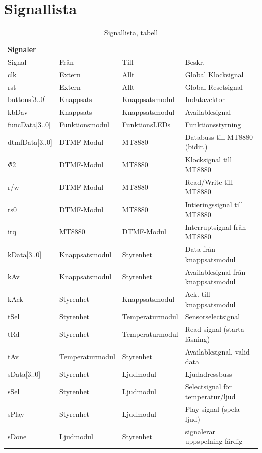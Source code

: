 \documentclass[a4paper,11pt]{article}
\begin{document}
	\section{Signallista}
	\begin{table} [H]
	\label{tab:signalTabell}
	\caption{Signallista, tabell} 
	\begin{tabular}{l l l l}
		{\bf Signaler}
		\\{Signal} & {Från} & {Till} & {Beskr.}\\
		\hline
		clk & Extern & Allt & Global Klocksignal\\
		rst & Extern & Allt & Global Resetsignal\\
		buttons[3..0] & Knappsats & Knappsatsmodul & Indatavektor\\
		kbDav & Knappsats & Knappsatsmodul & Availablesignal\\
		funcData[3..0] & Funktionsmodul & FunktionsLEDs & Funktionsstyrning\\
		dtmfData[3..0] & DTMF-Modul & MT8880 & Databuss till MT8880 (bidir.)\\
		\(\Phi\)2 & DTMF-Modul & MT8880 & Klocksignal till MT8880\\
		r/w & DTMF-Modul & MT8880 & Read/Write till MT8880\\
		rs0 & DTMF-Modul & MT8880 & Intieringssignal till MT8880\\
		irq & MT8880 & DTMF-Modul & Interruptsignal från MT8880\\

		kData[3..0] & Knappsatsmodul & Styrenhet & Data från knappsatsmodul\\
		kAv & Knappsatsmodul & Styrenhet & Availablesignal från knappsatsmodul\\
		kAck & Styrenhet & Knappsatsmodul & Ack. till knappsatsmodul\\

		tSel & Styrenhet & Temperaturmodul & Sensorselectsignal\\
		tRd & Styrenhet & Temperaturmodul & Read-signal (starta läsning)\\
		tAv & Temperaturmodul & Styrenhet & Availablesignal, valid data\\

		sData[3..0] & Styrenhet & Ljudmodul & Ljudadressbuss\\
		sSel & Styrenhet & Ljudmodul & Selectsignal för temperatur/ljud\\
		sPlay & Styrenhet & Ljudmodul & Play-signal (spela ljud)\\
		sDone & Ljudmodul & Styrenhet & signalerar uppspelning färdig\\


\end{tabular}
\end{table}
\end{document}

